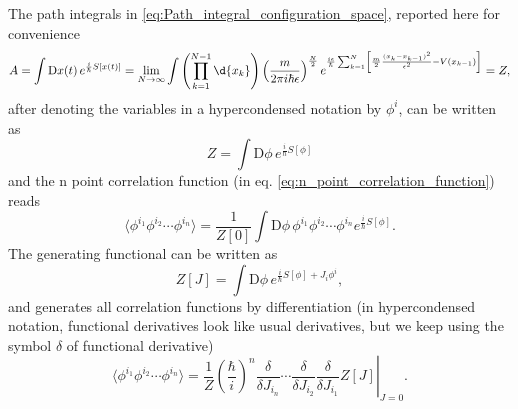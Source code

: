 The path integrals in \eqref{eq:Path_integral_configuration_space}, reported here for convenience
\[
    A = \int \mathrm{D} x(t) \, e^{\frac{i}{\hbar}S[x(t)]} = \lim_{N \to \infty} \int \left(\prod_{k=1}^{N-1} \d{x_k}\right) \left(\frac{m}{2\pi i \hbar \epsilon}\right)^{\frac{N}{2}} e^{\frac{i\epsilon}{\hbar}\sum_{k=1}^N \left[\frac{m}{2}\frac{(x_k - x_{k-1})^2}{\epsilon^2} - V(x_{k-1})\right]} = Z,
\]
after denoting the variables in a hypercondensed notation by \(\phi^i\), can be written as
\begin{equation}
    Z = \int \mathrm{D} \phi \, e^{\frac{i}{\hbar} S[\phi]}
    \label{eq:partition_function_hypercondensed}
\end{equation}
and the n point correlation function (in eq. \eqref{eq:n_point_correlation_function}) reads
\begin{equation}
    \langle \phi^{i_1} \phi^{i_2} \cdots \phi^{i_n} \rangle = \frac{1}{Z[0]} \int \mathrm{D} \phi \, \phi^{i_1} \phi^{i_2} \cdots \phi^{i_n} e^{\frac{i}{\hbar} S[\phi]}.
    \label{eq:n_point_correlation_function_hypercondensed}
\end{equation}
The generating functional can be written as
\begin{equation}
    Z[J] = \int \mathrm{D} \phi \, e^{\frac{i}{\hbar} S[\phi] + J_i \phi^i},
    \label{eq:generating_functional_hypercondensed}
\end{equation}
and generates all correlation functions by differentiation (in hypercondensed notation, functional derivatives look like usual derivatives, but we keep using the symbol \(\delta\) of functional derivative)
\[
    \langle \phi^{i_1} \phi^{i_2} \cdots \phi^{i_n} \rangle = \left. \frac{1}{Z} \left(\frac{\hbar}{i}\right)^n \frac{\delta}{\delta J_{i_n}} \cdots \frac{\delta}{\delta J_{i_2}} \frac{\delta}{\delta J_{i_1}} Z[J] \right|_{J=0}.
\]

